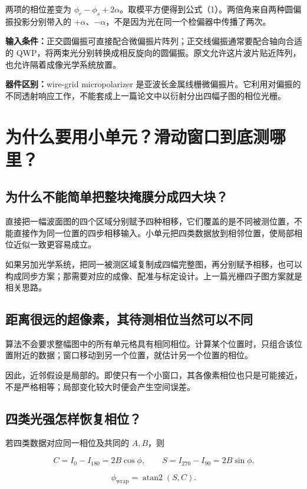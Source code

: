 \documentclass[UTF8,fontset=fandol,11pt,a4paper]{ctexart}
\begin{document}
两项的相位差变为 \(\phi_r-\phi_s+2\alpha\)。取模平方便得到公式（1）。两倍角来自两种圆偏振投影分别带入的 \(+\alpha\)、\(-\alpha\)，不是因为光在同一个检偏器中传播了两次。

\textbf{输入条件：}正交圆偏振可直接配合微偏振片阵列；正交线偏振通常要配合轴向合适的 QWP，将两束光分别转换成相反旋向的圆偏振。原文允许这片波片贴近阵列，也允许隔着成像光学系统放置。

\textbf{器件区别：}wire-grid micropolarizer 是亚波长金属线栅微偏振片。它利用对偏振的不同透射响应工作，不能套成上一篇论文中以衍射分出四幅子图的相位光栅。

\section{为什么要用小单元？滑动窗口到底测哪里？}

\subsection{为什么不能简单把整块掩膜分成四大块？}

直接把一幅波面图的四个区域分别赋予四种相移，它们覆盖的是不同被测位置，不能直接作为同一位置的四步相移输入。小单元把四类数据放到相邻位置，使局部相位近似一致更容易成立。

如果另加光学系统，把同一被测区域复制成四幅完整图，再分别赋予相移，也可以构成同步方案；那需要对应的成像、配准与标定设计。上一篇光栅四子图方案就是相关思路。

\subsection{距离很远的超像素，其待测相位当然可以不同}

算法不会要求整幅图中的所有单元格具有相同相位。计算某个位置时，只组合该位置附近的数据；窗口移动到另一个位置，就估计另一个位置的相位。

因此，近邻假设是局部的。即使只有一个小窗口，其各像素相位也只是可能接近，不是严格相等；局部变化较大时便会产生空间误差。

\subsection{四类光强怎样恢复相位？}

若四类数据对应同一相位及共同的 \(A,B\)，则

\[
C=I_0-I_{180}=2B\cos\phi,\qquad
S=I_{270}-I_{90}=2B\sin\phi.
\]

\[
\boxed{\phi_{\mathrm{wrap}}=\operatorname{atan2}(S,C).}
\]
\end{document}
